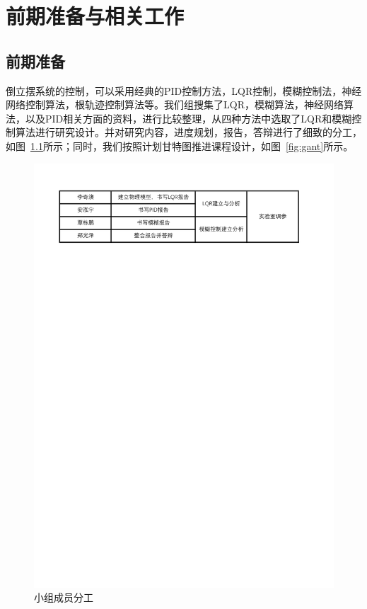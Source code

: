 \chapter{前期准备与相关工作}
\section{前期准备}

倒立摆系统的控制，可以采用经典的PID控制方法，LQR控制，模糊控制法，神经网络控制算法，根轨迹控制算法等。我们组搜集了LQR，模糊算法，神经网络算法，以及PID相关方面的资料，进行比较整理，从四种方法中选取了LQR和模糊控制算法进行研究设计。并对研究内容，进度规划，报告，答辩进行了细致的分工，如图~\ref{fig:fengong}所示；同时，我们按照计划甘特图推进课程设计，如图~\ref{fig:gant}所示。

\begin{figure}[h]
\centering
    \includegraphics[width=12cm]{fengong.pdf}
    \caption{小组成员分工}
    \label{fig:fengong}
\end{figure}


